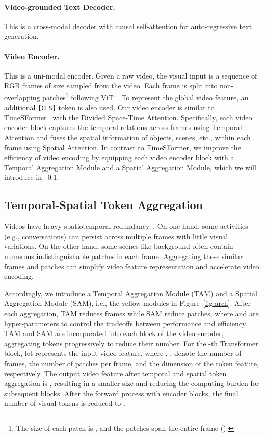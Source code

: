 \documentclass[11pt]{article}
\begin{document}
\paragraph{Video-grounded Text Decoder.} This is a cross-modal decoder with causal self-attention for auto-regressive text generation. 

\paragraph{Video Encoder.} This is a uni-modal encoder. 
Given a raw video, the visual input  is a sequence of  RGB frames of size  sampled from the video. 
Each frame is split into  non-overlapping patches\footnote{The size of each patch is , and the  patches span the entire frame ().} following ViT~\citep{Dosovitskiy2020AnII}. 
To represent the global video feature, an additional \texttt{[CLS]} token is also used.  
Our video encoder is similar to TimeSFormer~\citep{Bertasius2021IsSA} with the Divided Space-Time Attention. 
Specifically, each video encoder block captures the temporal relations across frames using Temporal Attention and fuses the spatial information of objects, scenes, etc., within each frame using Spatial Attention. 
In contrast to TimeSFormer, we improve the efficiency of video encoding by equipping each video encoder block with a Temporal Aggregation Module and a Spatial Aggregation Module, which we will introduce in \textsection~\ref{subsec:tsta}. 

\subsection{Temporal-Spatial Token Aggregation}
\label{subsec:tsta}
Videos have heavy spatiotemporal redundancy~\citep{He2021MaskedAA, Tong2022VideoMAEMA}. On one hand, some activities (e.g., conversations) can persist across multiple frames with little visual variations. On the other hand, some scenes like background often contain numerous indistinguishable patches in each frame. Aggregating these similar frames and patches can simplify video feature representation and accelerate video encoding.  


Accordingly, we introduce a Temporal Aggregation Module (TAM) and a Spatial Aggregation Module (SAM), i.e., the yellow modules in Figure~\ref{fig:arch}. After each aggregation, TAM reduces  frames while SAM reduce  patches, 
where  and  are hyper-parameters to control the tradeoffs between performance and efficiency. 
TAM and SAM are incorporated into each block of the video encoder, aggregating tokens progressively to reduce their number. 
For the -th Transformer block, let  represents the input video feature, where , ,  denote the number of frames, the number of patches per frame, and the dimension of the token feature, respectively. 
The output video feature after temporal and spatial token aggregation is , resulting in a smaller size and reducing the computing burden for subsequent blocks. 
After the forward process with  encoder blocks, the final number of visual tokens is reduced to .  
\end{document}
